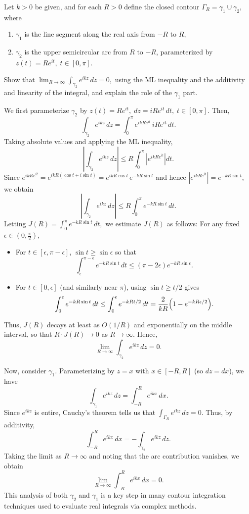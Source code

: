 \exampleline
\begin{example}
Let \( k > 0 \) be given, and for each \( R > 0 \) define the closed contour
\(
\Gamma_R = \gamma_1 \cup \gamma_2,
\)
where 
\begin{enumerate}
    \item \(\gamma_1\) is the line segment along the real axis from \(-R\) to \(R\),
    \item \(\gamma_2\) is the upper semicircular arc from \(R\) to \(-R\), parameterized by 
    \( z(t)=Re^{it},\; t\in[0,\pi] \).
\end{enumerate}
Show that 
\(
\lim_{R\to\infty}\int_{\gamma_2} e^{ikz}\,dz = 0,
\)
using the ML inequality and the additivity and linearity of the integral, and explain the role of the \(\gamma_1\) part.

\begin{solution}
We first parameterize \(\gamma_2\) by 
\(
z(t)=Re^{it},\; dz=iRe^{it}\,dt,\; t\in[0,\pi].
\)
Then,
\[
\int_{\gamma_2} e^{ikz}\,dz = \int_0^{\pi} e^{ikRe^{it}}\, iRe^{it}\,dt.
\]
Taking absolute values and applying the ML inequality,
\[
\left|\int_{\gamma_2} e^{ikz}\,dz\right| \le R\int_0^{\pi}\left|e^{ikRe^{it}}\right|dt.
\]
Since 
\(
e^{ikRe^{it}} = e^{ikR(\cos t + i\sin t)} = e^{ikR\cos t}\,e^{-kR\sin t}
\)
and hence 
\(
\left|e^{ikRe^{it}}\right| = e^{-kR\sin t},
\)
we obtain
\[
\left|\int_{\gamma_2} e^{ikz}\,dz\right| \le R\int_0^\pi e^{-kR\sin t}\,dt.
\]
Letting 
\(
J(R)=\int_0^\pi e^{-kR\sin t}\,dt,
\)
we estimate \(J(R)\) as follows: For any fixed \(\epsilon\in(0,\tfrac{\pi}{2})\),
\begin{itemize}
    \item For \(t\in[\epsilon,\pi-\epsilon]\), \(\sin t\ge\sin\epsilon\) so that
    \[
    \int_{\epsilon}^{\pi-\epsilon} e^{-kR\sin t}\,dt \le (\pi-2\epsilon)e^{-kR\sin\epsilon}.
    \]
    \item For \(t\in[0,\epsilon]\) (and similarly near \(\pi\)), using \(\sin t\ge t/2\) gives
    \[
    \int_{0}^{\epsilon} e^{-kR\sin t}\,dt \le \int_0^{\epsilon} e^{-kRt/2}\,dt = \frac{2}{kR}\Bigl(1-e^{-kR\epsilon/2}\Bigr).
    \]
\end{itemize}
Thus, \( J(R) \) decays at least as \( O(1/R) \) and exponentially on the middle interval, so that 
\(
R\cdot J(R)\to0 \) as \( R\to\infty.
\)
Hence,
\[
\lim_{R\to\infty}\int_{\gamma_2} e^{ikz}\,dz = 0.
\]

Now, consider \(\gamma_1\). Parameterizing by \( z=x \) with \( x\in[-R,R] \) (so \(dz=dx\)), we have
\[
\int_{\gamma_1} e^{ikz}\,dz = \int_{-R}^{R} e^{ikx}\,dx.
\]
Since \( e^{ikz} \) is entire, Cauchy's theorem tells us that 
\(
\int_{\Gamma_R} e^{ikz}\,dz = 0.
\)
Thus, by additivity,
\[
\int_{-R}^{R} e^{ikx}\,dx = -\int_{\gamma_2} e^{ikz}\,dz.
\]
Taking the limit as \( R\to\infty \) and noting that the arc contribution vanishes, we obtain
\[
\lim_{R\to\infty}\int_{-R}^{R} e^{ikx}\,dx = 0.
\]
This analysis of both \(\gamma_2\) and \(\gamma_1\) is a key step in many contour integration techniques used to evaluate real integrals via complex methods.

\end{solution}
\end{example}
\exampleline




